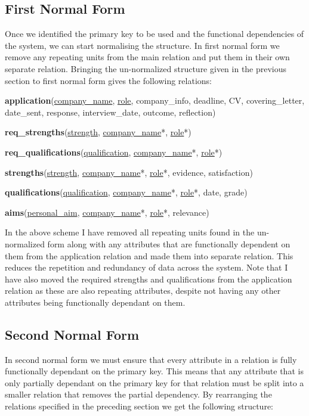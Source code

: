 \documentclass{article}
\begin{document}
\subsection{First Normal Form}

Once we identified the primary key to be used and the functional dependencies of the system, we can start normalising the structure. In first normal form we remove any repeating units from the main relation and put them in their own separate relation. Bringing the un-normalized structure given in the previous section to first normal form gives the following relations:

\textbf{application}(\underline{company\_name}, \underline{role}, company\_info, deadline, CV, covering\_letter, date\_sent, response, interview\_date, outcome, reflection)

\textbf{req\_strengths}(\underline{strength}, \underline{company\_name}*, \underline{role}*)

\textbf{req\_qualifications}(\underline{qualification}, \underline{company\_name}*, \underline{role}*)

\textbf{strengths}(\underline{strength}, \underline{company\_name}*, \underline{role}*, evidence, satisfaction)

\textbf{qualifications}(\underline{qualification}, \underline{company\_name}*, \underline{role}*, date, grade)

\textbf{aims}(\underline{personal\_aim}, \underline{company\_name}*, \underline{role}*, relevance)

In the above scheme I have removed all repeating units found in the un-normalized form along with any attributes that are functionally dependent on them from the application relation and made them into separate relation. This reduces the repetition and redundancy of data across the system. Note that I have also moved the required strengths and qualifications from the application relation as these are also repeating attributes, despite not having any other attributes being functionally dependant on them.

\subsection{Second Normal Form}

In second normal form we must ensure that every attribute in a relation is fully functionally dependant on the primary key. This means that any attribute that is only partially dependant on the primary key for that relation must be split into a smaller relation that removes the partial dependency. By rearranging the relations specified in the preceding section we get the following structure:
\end{document}
